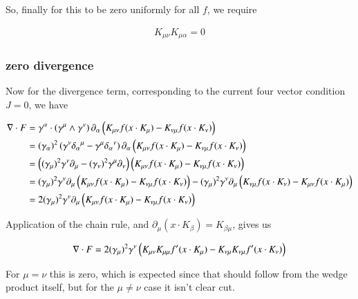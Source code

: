 \documentclass{article}
\begin{document}
So, finally for this to be zero uniformly for all $f$, we require

\begin{align*}
K_{\mu\nu} K_{\mu\alpha} = 0 
\end{align*}

\subsubsection{ zero divergence }

Now for the divergence term, corresponding to the current four vector condition $J = 0$, we have

\begin{align*}
\nabla \cdot F 
&= \gamma^\alpha \cdot
\left(\gamma^\mu \wedge \gamma^\nu\right) \partial_\alpha \left( K_{\mu\nu} f( x \cdot K_\mu ) -K_{\nu\mu} f( x \cdot K_\nu ) \right) \\
&= 
(\gamma_\alpha)^2 
\left( \gamma^\nu {\delta_\alpha}^\mu -\gamma^\mu {\delta_\alpha}^\nu \right)
\partial_\alpha \left( K_{\mu\nu} f( x \cdot K_\mu ) -K_{\nu\mu} f( x \cdot K_\nu ) \right) \\
&= 
\left(
(\gamma_\mu)^2 \gamma^\nu \partial_\mu 
-(\gamma_\nu)^2 \gamma^\mu \partial_\nu 
\right)
\left( K_{\mu\nu} f( x \cdot K_\mu ) -K_{\nu\mu} f( x \cdot K_\nu ) \right) \\
&= 
(\gamma_\mu)^2 \gamma^\nu \partial_\mu \left( K_{\mu\nu} f( x \cdot K_\mu ) -K_{\nu\mu} f( x \cdot K_\nu ) \right) 
-(\gamma_\mu)^2 \gamma^\nu \partial_\mu \left( K_{\nu\mu} f( x \cdot K_\nu ) -K_{\mu\nu} f( x \cdot K_\mu ) \right) \\
&= 2 (\gamma_\mu)^2 \gamma^\nu \partial_\mu \left( K_{\mu\nu} f( x \cdot K_\mu ) -K_{\nu\mu} f( x \cdot K_\nu ) \right) \\
\end{align*}

Application of the chain rule, and $\partial_\mu ( x \cdot K_\beta ) = K_{\beta\mu}$, gives us

\begin{align*}
\nabla \cdot F 
&= 2 (\gamma_\mu)^2 \gamma^\nu \left( K_{\mu\nu} K_{\mu\mu} f'( x \cdot K_\mu ) -K_{\nu\mu} K_{\nu\mu} f'( x \cdot K_\nu ) \right) \\
\end{align*}

For $\mu = \nu$ this is zero, which is expected since that should follow from the wedge product itself, but for the $\mu \ne \nu$
case it isn't clear cut.
\end{document}
